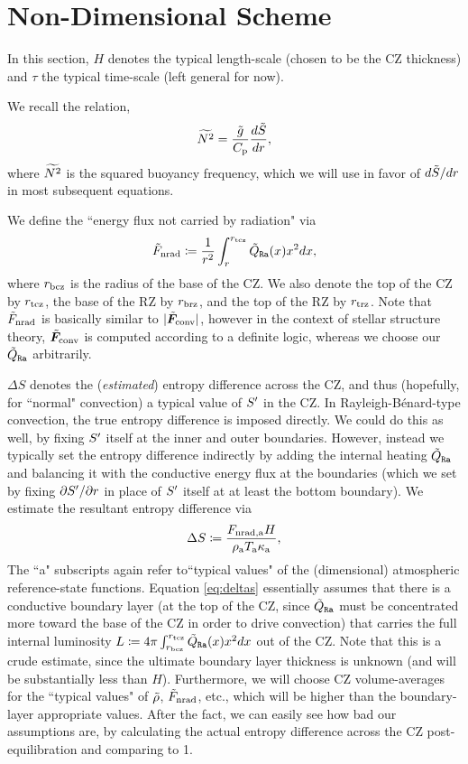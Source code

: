 \documentclass[12pt]{article}
\numberwithin{equation}{section}
\newcommand{\tmpa}{T_{\rm a}}
\newcommand{\rhoa}{\rho_{\rm a}}
\newcommand{\kappaa}{\kappa_{\rm a}}
\newcommand{\fnrada}{F_{\rm{nrad,a}}}
\begin{document}
	\section{Non-Dimensional Scheme}\label{sec:ndscheme}
	In this section, $H$ denotes the typical length-scale (chosen to be the CZ thickness) and $\tau$ the typical time-scale (left general for now). 
	
	We recall the relation,
	\begin{align}\label{eq:nsq}
	\widetilde{N^2} = \frac{\tilde{g}}{C_{\rm{p}}}\frac{d\tilde{S}}{dr},
	\end{align}
	where $\widetilde{N^2}$ is the squared buoyancy frequency, which we will use in favor of $d\tilde{S}/dr$ in most subsequent equations.
	
	We define the ``energy flux not carried by radiation" via
	\begin{align}
		\tilde{F}_{\rm nrad} \coloneqq \frac{1}{r^2}\int_{r}^{r_{\rm tcz}}\tilde{Q}_{\texttt{Ra}}(x)x^2dx,
	\end{align}
	where $r_{\rm bcz}$ is the radius of the base of the CZ. We also denote the top of the CZ by $r_{\rm tcz}$, the base of the RZ by $r_{\rm brz}$, and the top of the RZ by $r_{\rm trz}$. Note that $\tilde{F}_{\rm nrad}$ is basically similar to $|\tilde{\bm{F}}_{\rm conv}|$, however in the context of stellar structure theory, $\tilde{\bm{F}}_{\rm conv}$ is computed according to a definite logic, whereas we choose our $\tilde{Q}_{\texttt{Ra}}$ arbitrarily.
	
	$\Delta S$ denotes the (\textit{estimated}) entropy difference across the CZ, and thus (hopefully, for ``normal" convection) a typical value of ${S^\prime}$ in the CZ. In Rayleigh-B\'enard-type convection, the true entropy difference is imposed directly. We could do this as well, by fixing ${S^\prime}$ itself at the inner and outer boundaries. However, instead we typically set the entropy difference indirectly by adding the internal heating $\tilde{Q}_{\texttt{Ra}}$ and balancing it with the conductive energy flux at the boundaries (which we set by fixing $\partial{S^\prime}/\partial r$ in place of ${S^\prime}$ itself at at least the bottom boundary). We estimate the resultant entropy difference via
	\begin{align}\label{eq:deltas}
		\Delta S \define \frac{\fnrada H}{\rhoa\tmpa\kappaa},
	\end{align}
	The ``a" subscripts again refer to``typical values" of the (dimensional) atmospheric reference-state functions. Equation \eqref{eq:deltas} essentially assumes that there is a conductive boundary layer (at the top of the CZ, since $\tilde{Q}_{\texttt{Ra}}$ must be concentrated more toward the base of the CZ in order to drive convection) that carries the full internal luminosity $L\coloneqq 4\pi \int_{r_{\rm bcz}}^{r_{\rm tcz}}\tilde{Q}_{\texttt{Ra}}(x)x^2dx$ out of the CZ. Note that this is a crude estimate, since the ultimate boundary layer thickness is unknown (and will be substantially less than $H$). Furthermore, we will choose CZ volume-averages for the ``typical values" of $\tilde{\rho}$, $\tilde{F}_{\rm nrad}$, etc., which will be higher than the boundary-layer appropriate values. After the fact, we can easily see how bad our assumptions are, by calculating the actual entropy difference across the CZ post-equilibration and comparing to 1. 
	
\end{document}
